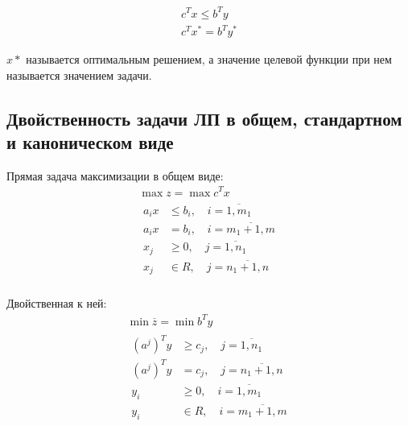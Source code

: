 \documentclass[a4paper,article,14pt]{extarticle}
\begin{document}
\begin{equation}
    \begin{gathered}
        c^T x \le b^T y \\
        c^T x^* = b^T y^*
    \end{gathered}
\end{equation}

\(x*\) называется оптимальным решением, а значение целевой функции при нем называется значением задачи.

\subsection{Двойственность задачи ЛП в общем, стандартном и каноническом виде}

Прямая задача максимизации в общем виде:
\begin{equation}
    \begin{gathered}
        \max z = \max c^T x \\
        \begin{aligned}
            a_ix & \le b_i, \quad i = \overline{1, m_1} \\
            a_ix & = b_i, \quad i = \overline{m_1 + 1, m} \\
            x_j & \ge 0, \quad j = \overline{1, n_1} \\
            x_j & \in R, \quad j = \overline{n_1 + 1, n} \\
        \end{aligned}
    \end{gathered}
\end{equation}

Двойственная к ней:
\begin{equation}
    \begin{gathered}
    \min \overline z = \min b^T y \\
        \begin{aligned}
            (a^j)^Ty & \ge c_j, \quad j = \overline{1, n_1} \\
            (a^j)^Ty & = c_j, \quad j = \overline{n_1 + 1, n} \\
            y_i & \ge 0, \quad i = \overline{1, m_1} \\
            y_i & \in R, \quad i = \overline{m_1 + 1, m} \\
        \end{aligned}
    \end{gathered}
\end{equation}
\end{document}
